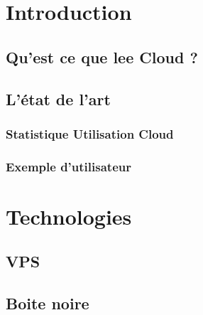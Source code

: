 \documentclass{article}
\begin{document}
\mdxtitleblockstart{}
\mdxauthorstart{}
\mdxauthorend\mdxtitleblockend%
\section{Introduction}\label{sec-introduction}%

\subsection{Qu'est ce que lee Cloud ?}\label{sec-quest-ce-que-lee-cloud-}%

\subsection{L'état de l'art}\label{sec-ltat-de-lart}%

\subsubsection{Statistique Utilisation Cloud}\label{sec-statistique-utilisation-cloud}%

\subsubsection{Exemple d'utilisateur}\label{sec-exemple-dutilisateur}%

\section{Technologies}\label{sec-technologies}%

\subsection{VPS}\label{sec-vps}%

\subsection{Boite noire}\label{sec-boite-noire}%
\end{document}
